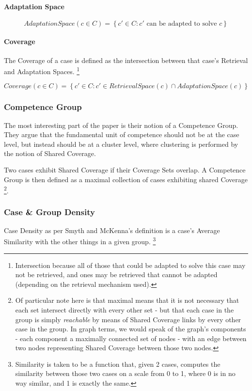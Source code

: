 \documentclass[a4paper,11pt]{report}
\begin{document}
\paragraph{Adaptation Space}

\[ AdaptationSpace(c \in C) = \left\{ c' \in C : c' \text{ can be adapted to solve } c \right\} \]

\paragraph{Coverage}

The Coverage of a case is defined as the intersection between that case's Retrieval and Adaptation Spaces. \footnote{Intersection because all of those that could be adapted to solve this case may not be retrieved, and ones may be retrieved that cannot be adapted (depending on the retrieval mechanism used).}

\[ Coverage(c \in C) = \left\{ c' \in C : c' \in RetrievalSpace(c) \cap AdaptationSpace(c) \right\} \]


\subsubsection{Competence Group}
The most interesting part of the paper is their notion of a Competence Group. They argue that the fundamental unit of competence should not be at the case level, but instead should be at a cluster level, where clustering is performed by the notion of Shared Coverage.

Two cases exhibit Shared Coverage if their Coverage Sets overlap. A Competence Group is then defined as a maximal  collection  of  cases  exhibiting  shared Coverage \footnote{Of particular note here is that maximal means that it is not necessary that each set intersect directly with every other set - but that each case in the group is simply \emph{reachable} by means of Shared Coverage links by every other case in the group. In graph terms, we would speak of the graph's components - each component a maximally connected set of nodes - with an edge between two nodes representing Shared Coverage between those two nodes.}.

\subsubsection{Case \& Group Density}

Case Density as per Smyth and McKenna's definition is a case's Average Similarity with the other things in a given group. \footnote{Similarity is taken to be a function that, given 2 cases, computes the similarity between those two cases on a scale from 0 to 1, where 0 is in no way similar, and 1 is exactly the same.}
\end{document}
